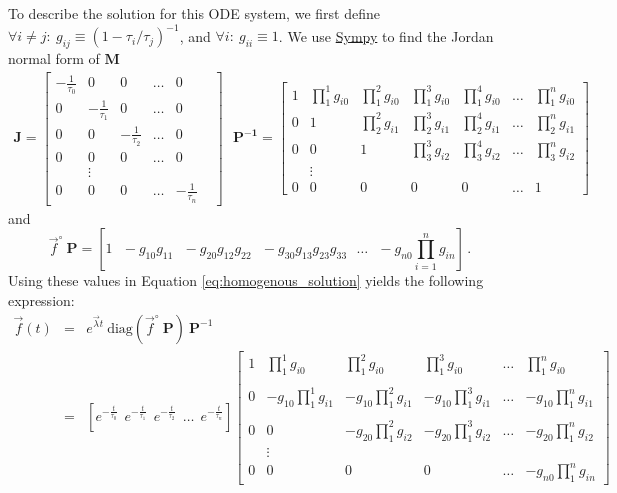 \documentclass{article}
\newcommand{\finit}{\ensuremath{\vec{f}^\circ}}
\begin{document}
To describe the solution for this ODE system, we first define $\forall i \neq j:~g_{ij} \equiv (1 - \tau_i/\tau_j)^{-1}$, and $\forall i:~g_{ii} \equiv 1$. We use \href{https://www.sympy.org/}{Sympy} to find the Jordan normal form of $\mathbf{M}$
\begin{eqnarray}
\mathbf{J} =
  \begin{bmatrix}
    -\frac{1}{\tau_0} & 0 & 0 & \ldots & 0 \\
    0 & -\frac{1}{\tau_1} & 0 & \ldots & 0 \\
    0 & 0 & -\frac{1}{\tau_2} & \ldots & 0 \\
    0 & 0 & 0 & \ldots & 0 \\
     & \vdots & & & & \\
    0 & 0 & 0 & \ldots & -\frac{1}{\tau_n}
\end{bmatrix}
~~~
\mathbf{P^{-1}} =
\begin{bmatrix}
1 & \prod_1^1 g_{i0} & \prod_1^2 g_{i0} & \prod_1^3 g_{i0} & \prod_1^4 g_{i0} & \ldots & \prod_1^n g_{i0} \\
0 & 1 & \prod_2^2 g_{i1} & \prod_2^3 g_{i1} & \prod_2^4 g_{i1} & \ldots & \prod_2^n g_{i1} \\
0 & 0 & 1 & \prod_3^3 g_{i2} & \prod_3^4 g_{i2} & \ldots & \prod_3^n g_{i2} \\
& \vdots & & & & & \\
0 & 0 & 0 & 0 & 0 & \ldots & 1
\end{bmatrix}
\end{eqnarray}
and\[\finit~\mathbf{P} = \left[1 ~~~ -g_{10}g_{11} ~~~ -g_{20}g_{12}g_{22} ~~~ -g_{30}g_{13}g_{23}g_{33} ~~~ \ldots ~~~ -g_{n0}\prod_{i=1}^n g_{in} \right]\,.\]
Using these values in Equation \ref{eq:homogenous_solution} yields the following expression:
\begin{eqnarray}
	\vec{f}(t) &=& e^{\vec{\lambda} t} ~ \text{diag}\left(\finit~\mathbf{P}\right) ~ \mathbf{P}^{-1} \\
	&=&
	\left[ e^{-\frac{t}{\tau_0}} ~~ e^{-\frac{t}{\tau_1}} ~~ e^{-\frac{t}{\tau_2}} ~~ \ldots ~~ e^{-\frac{t}{\tau_n}}\right]
    \begin{bmatrix}
        1 & \prod_1^1 g_{i0} & \prod_1^2 g_{i0} & \prod_1^3 g_{i0} & \ldots & \prod_1^n g_{i0} \\ \\
        0 & -g_{10}\prod_1^1 g_{i1} & -g_{10}\prod_1^2 g_{i1} & -g_{10}\prod_1^3 g_{i1}  & \ldots & -g_{10}\prod_1^n g_{i1} \\ \\
        0 & 0 & -g_{20}\prod_1^2 g_{i2} & -g_{20}\prod_1^3 g_{i2} & \ldots & -g_{20}\prod_1^n g_{i2} \\
         & \vdots & & & & \\
        0 & 0 & 0 & 0 & \ldots & -g_{n0}\prod_1^n g_{in}
    \end{bmatrix} \nonumber
\end{eqnarray}
\end{document}
